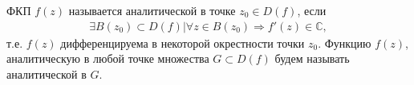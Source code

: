 
\begin{col-answer-preambule}
\end{col-answer-preambule}
ФКП $f(z)$ называется аналитической в точке $z_0 \in D(f)$, если
\begin{align*}
  \exists B(z_0) \subset D(f) \vert \forall z \in B(z_0) \Rightarrow f'(z) \in \mathbb{C},
\end{align*}
т.е. $f(z)$ дифференцируема в некоторой окрестности точки $z_0$. Функцию $f(z)$, аналитическую в
любой точке множества $G \subset D(f)$ будем называть аналитической в $G$.

